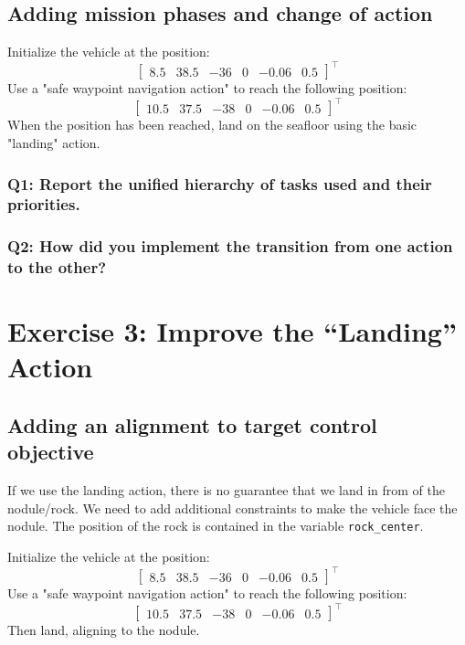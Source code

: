 \documentclass{article}
\begin{document}
\subsection{Adding mission phases and change of action}
Initialize the vehicle at the position:
\begin{displaymath}
\begin{bmatrix} 8.5 & 38.5 & -36 & 0 & -0.06 & 0.5 \end{bmatrix}^\top
\end{displaymath}
Use a "safe waypoint navigation action" to reach the following position:
\begin{displaymath}
\begin{bmatrix} 10.5 & 37.5 & -38 & 0 & -0.06 & 0.5 \end{bmatrix}^\top
\end{displaymath}
When the position has been reached, land on the seafloor using the basic "landing" action.

\subsubsection{Q1: Report the unified hierarchy of tasks used and their priorities.}

\subsubsection{Q2: How did you implement the transition from one action to the other?}

\clearpage

\section{Exercise 3: Improve the “Landing” Action}
\subsection{Adding an alignment to target control objective}
If we use the landing action, there is no guarantee that we land in from of the nodule/rock. We need to add additional constraints to make the vehicle face the nodule. The position of the rock is contained in the variable \texttt{rock\_center}.

Initialize the vehicle at the position:
\begin{displaymath}
\begin{bmatrix} 8.5 & 38.5 & -36 & 0 & -0.06 & 0.5 \end{bmatrix}^\top
\end{displaymath}
Use a "safe waypoint navigation action" to reach the following position:
\begin{displaymath}
\begin{bmatrix} 10.5 & 37.5 & -38 & 0 & -0.06 & 0.5 \end{bmatrix}^\top
\end{displaymath}
Then land, aligning to the nodule.
\end{document}
